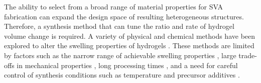 The ability to select from a broad range of material properties for SVA fabrication can expand the design space of resulting heterogeneous structures. Therefore, a synthesis method that can tune the ratio and rate of hydrogel volume change is required. 
A variety of physical and chemical methods have been explored to alter the swelling properties of hydrogels \cite{Zhang2008,Imran2010}. 
These methods are limited by factors such as the narrow range of achievable swelling properties \cite{Kim2016,Gan2001}, large trade-offs in mechanical properties \cite{Li2018,Depa2012}, long processing times \cite{Zhou2018b, Ma2014}, and a need for careful control of synthesis conditions such as temperature \cite{Otsuka2012} and precursor additives \cite{Bodenberger2016}.\\ 
